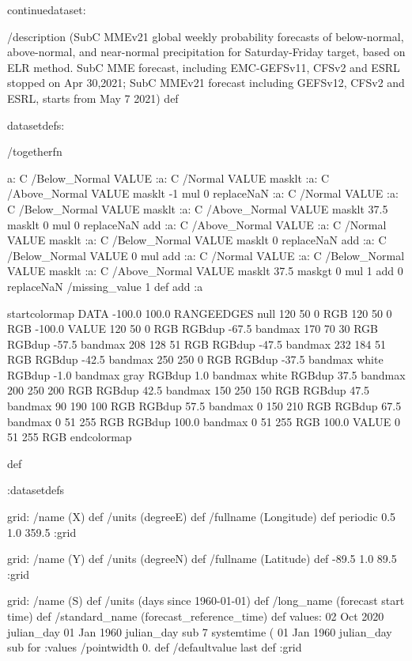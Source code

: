 \begin{ingrid}

continuedataset:

/description (SubC MMEv21 global weekly probability forecasts of below-normal, above-normal, and near-normal precipitation for Saturday-Friday target, based on ELR method. SubC MME forecast, including EMC-GEFSv11, CFSv2 and ESRL stopped on Apr 30,2021; SubC MMEv21 forecast including GEFSv12, CFSv2 and ESRL, starts from May 7 2021) def

datasetdefs:

/togetherfn {
 a:
    C /Below_Normal VALUE
    :a:
     C /Normal VALUE
     masklt
    :a:
     C /Above_Normal VALUE
     masklt
    -1 mul
    0 replaceNaN
    :a:
     C /Normal VALUE
     :a:
      C /Below_Normal VALUE
      masklt
     :a:
      C /Above_Normal VALUE
      masklt
     37.5 masklt
     0 mul
     0 replaceNaN           
     add
    :a:
     C /Above_Normal VALUE
     :a:
      C /Normal VALUE
      masklt
     :a:
      C /Below_Normal VALUE
      masklt
     0 replaceNaN
     add
 :a:
     C /Below_Normal VALUE
     0 mul
     add
    :a:
     C /Normal VALUE
     :a:
      C /Below_Normal VALUE
      masklt
     :a:
      C /Above_Normal VALUE        
      masklt
     37.5 maskgt
     0 mul
     1 add
     0 replaceNaN
     /missing_value 1 def
     add
    :a

startcolormap
DATA -100.0 100.0 RANGEEDGES
null 120 50 0 RGB
120 50 0 RGB -100.0 VALUE
120 50 0 RGB RGBdup -67.5 bandmax
170 70 30 RGB RGBdup -57.5 bandmax
208 128 51 RGB RGBdup -47.5 bandmax
232 184 51 RGB RGBdup -42.5 bandmax
250 250 0 RGB RGBdup -37.5 bandmax
white RGBdup -1.0 bandmax
gray RGBdup 1.0 bandmax
white RGBdup 37.5 bandmax
200 250 200 RGB RGBdup 42.5 bandmax
150 250 150 RGB RGBdup 47.5 bandmax
90 190 100 RGB RGBdup 57.5 bandmax
0 150 210 RGB RGBdup 67.5 bandmax
0 51 255 RGB RGBdup 100.0 bandmax
0 51 255 RGB 100.0 VALUE
0 51 255 RGB
endcolormap
} def 

:datasetdefs


grid:
/name (X) def
/units (degreeE) def
/fullname (Longitude) def
periodic
0.5 1.0 359.5
:grid

grid:
/name (Y) def
/units (degreeN) def
/fullname (Latitude) def
-89.5 1.0 89.5
:grid


grid:
/name (S) def
/units (days since 1960-01-01) def
/long_name (forecast start time) def
/standard_name (forecast_reference_time) def
values:
02 Oct 2020 julian_day 01 Jan 1960 julian_day sub
7
systemtime
(%
01 Jan 1960 julian_day sub
{} for
:values
/pointwidth 0. def
/defaultvalue { last } def
:grid


\end{ingrid}
